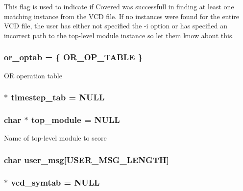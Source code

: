 This flag is used to indicate if Covered was successfull in finding at least one matching instance from the VCD file. If no instances were found for the entire VCD file, the user has either not specified the -i option or has specified an incorrect path to the top-level module instance so let them know about this. 
\subsubsection{ or\_\-optab = \{ OR\_\-OP\_\-TABLE \}}\label{db_8c_a5}


OR operation table 
\subsubsection{ $\ast$ timestep\_\-tab = NULL}\label{db_8c_a14}


\subsubsection{\setlength{\rightskip}{0pt plus 5cm}char $\ast$ top\_\-module = NULL}\label{db_8c_a0}


Name of top-level module to score 
\subsubsection{\setlength{\rightskip}{0pt plus 5cm}char user\_\-msg[USER\_\-MSG\_\-LENGTH]}\label{db_8c_a6}


\subsubsection{ $\ast$ vcd\_\-symtab = NULL}\label{db_8c_a13}


